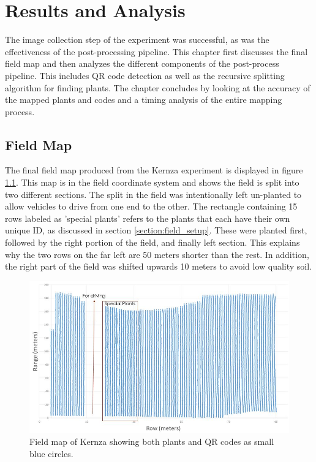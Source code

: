 
\cleardoublepage

\chapter{Results and Analysis}
\label{chapter:results}

The image collection step of the experiment was successful, as was the effectiveness of the post-processing pipeline.  This chapter first discusses the final field map and then analyzes the different components of the post-process pipeline.  This includes QR code detection as well as the recursive splitting algorithm for finding plants.  The chapter concludes by looking at the accuracy of the mapped plants and codes and a timing analysis of the entire mapping process.

\section{Field Map}

The final field map produced from the Kernza experiment is displayed in figure \ref{figure:field_map}.  This map is in the field coordinate system and shows the field is split into two different sections.  The split in the field was intentionally left un-planted to allow vehicles to drive from one end to the other.   The rectangle containing 15 rows labeled as 'special plants' refers to the plants that each have their own unique ID, as discussed in section \ref{section:field_setup}.  These were planted first, followed by the right portion of the field, and finally left section.  This explains why the two rows on the far left are 50 meters shorter than the rest. In addition, the right part of the field was shifted upwards 10 meters to avoid low quality soil.

\begin{figure}
	\centering
    \includegraphics[width=6in]{figures/field_map.jpg}
    \caption[Field map]{Field map of Kernza showing both plants and QR codes as small blue circles.}
    \label{figure:field_map}
\end{figure}

